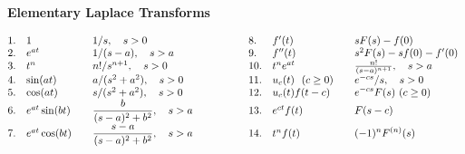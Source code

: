 \begin{center}
    {\bf Elementary Laplace Transforms}\\[0pt]
\end{center}
$
\hspace*{-.5em}
\begin{array}{lllllll}
 1.  & 1 \quad  & 1/s,\quad s>0 & \qquad  \ \quad & 8.  & f'(t) \  \quad  &  sF(s) - f(0)\\[0ex]
 2.  & e^{at} \quad  & 1/(s-a),\quad s>a  & \qquad  \ \quad & 9.  & f''(t) \  \quad   & s^2F(s) - sf(0) - f'(0) \\[0ex]
 3.  & t^n  \quad  & n!/s^{n+1},\quad s>0 & \qquad  \ \quad & 10.  & t^n e^{at}\  \quad  & \frac{n!}{(s-a)^{n+1}},\quad s>a\\[0ex] 
 4.  & \sin(at) \quad  & a/(s^2+a^2),\quad s>0  & \qquad  \ \quad & 11. & u_c(t)\ \ (c\ge 0) \quad  & e^{-cs}/s,\quad s>0 \\[0ex]
 5.  & \cos(at) \quad  & s/(s^2+a^2),\quad s>0  & \qquad  \ \quad & 12.  & u_c(t)f(t-c)\  \quad  & \displaystyle  e^{-cs} F(s) \ (c\ge 0) \\[0ex] 
 6.  & e^{at}\sin(bt) \quad  & \displaystyle \frac{b}{(s-a)^2+b^2},\quad s>a  & \qquad  \ \quad & 13.  & e^{ct}f(t) \quad  & \displaystyle  F(s-c) \\[0ex] 
 7.  & e^{at}\cos(bt) \quad  & \displaystyle \frac{s-a}{(s-a)^2+b^2},\quad s>a & \qquad  \ \quad & 14.  & t^n f(t) \quad  & \displaystyle  (-1)^n F^{(n)}(s)  
\end{array} 
$